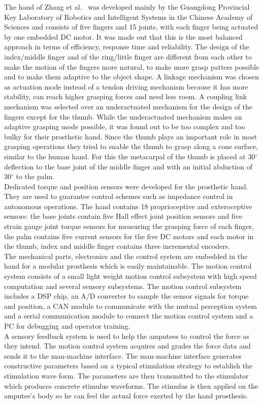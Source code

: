 \documentclass[a4paper, 10pt, conference]{ieeeconf}      %
\begin{document}
The hand of Zhang et al.~\cite{zhang} was developed mainly by the Guangdong Provincial Key Laboratory of Robotics and Intelligent Systems in the Chinese Academy of Sciences and consists of five fingers and 15 joints, with each finger being actuated by one embedded DC motor. It was made out that this is the most balanced approach in terms of efficiency, response time and reliability. The design of the index/middle finger and of the ring/little finger are different from each other to make the motion of the fingers more natural, to make more grasp patters possible and to make them adaptive to the object shape. A linkage mechanism was chosen as actuation mode instead of a tendon driving mechanism because it has more stability, can reach higher grasping forces and need less room. A coupling link mechanism was selected over an underactuated mechanism for the design of the fingers except for the thumb. While the underactuated mechanism makes an adaptive grasping mode possible, it was found out to be too complex and too bulky for their prosthetic hand. Since the thumb plays an important role in most grasping operations they tried to enable the thumb to grasp along a cone surface, similar to the human hand. For this the metacarpal of the thumb is placed at 30$^\circ$ deflection to the base joint of the middle finger and with an initial abduction of 30$^\circ$ to the palm.\\
Dedicated torque and position sensors were developed for the prosthetic hand. They are used to guarantee control schemes such as impedance control in autonomous operations. The hand contains 18 proprioceptive and exteroceptive sensors: the base joints contain five Hall effect joint position sensors and five strain gauge joint torque sensors for measuring the grasping force of each finger, the palm contains five current sensors for the five DC motors and each motor in the thumb, index and middle finger contains three incremental encoders.\\
The mechanical parts, electronics and the control system are embedded in the hand for a modular prosthesis which is easily maintainable. The motion control system consists of a small light weight motion control subsystem with high speed computation and several sensory subsystems. The motion control subsystem includes a DSP chip, an A/D converter to sample the sensor signals for torque and position, a CAN module to communicate with the mutual perception system and a serial communication module to connect the motion control system and a PC for debugging and operator training.\\
A sensory feedback system is used to help the amputees to control the force as they intend. The motion control system acquires and grades the force data and sends it to the man-machine interface. The man-machine interface generates constructive parameters based on a typical stimulation strategy to establish the stimulation wave form. The parameters are then transmitted to the stimulator which produces concrete stimulus waveforms. The stimulus is then applied on the amputee's body so he can feel the actual force exerted by the hand prosthesis. 
\end{document}
